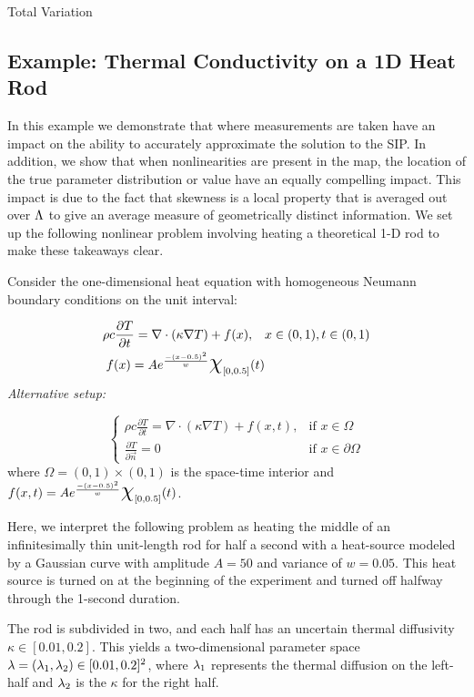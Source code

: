 Total Variation\subsection{Example: Thermal Conductivity on a 1D Heat Rod}\label{ex:heat-set-sample-accuracy}
In this example we demonstrate that where measurements are taken have an impact on the ability to accurately approximate the solution to the SIP.
In addition, we show that when nonlinearities are present in the map, the location of the true parameter distribution or value have an equally compelling impact.
This impact is due to the fact that skewness is a local property that is averaged out over ${\Lambda}$ to give an average measure of geometrically distinct information.
We set up the following nonlinear problem involving heating a theoretical 1-D rod to make these takeaways clear.

Consider the one-dimensional heat equation with homogeneous Neumann boundary conditions on the unit interval:

\begin{equation}
\begin{split}
\rho c \frac{\partial T}{\partial t} = \nabla \cdot ( \kappa \nabla T) + f(x), \quad & x\in (0,1), t\in (0,1) \\
f(x) = A e^\frac{- (x-0.5)^2}{w} \Chi_{[0,0.5]}(t)
\end{split}
\end{equation}
\emph{Alternative setup: }

\begin{equation}
\begin{cases}
\rho c \frac{\partial T}{\partial t} = \nabla \cdot ( \kappa \nabla T) + f(x,t), & \text{if } x\in \Omega \\
\frac{\partial T}{\partial \vec{n}} = 0 & \text{if } x\in \partial \Omega
\end{cases}
\end{equation}
where $\Omega = (0,1)\times (0,1)$ is the space-time interior and $f(x,t) = A e^\frac{- (x-0.5)^2}{w} \Chi_{[0,0.5]}(t)$.

Here, we interpret the following problem as heating the middle of an infinitesimally thin unit-length rod for half a second with a heat-source modeled by a Gaussian curve with amplitude $A=50$ and variance of $w=0.05$.
This heat source is turned on at the beginning of the experiment and turned off halfway through the 1-second duration.

The rod is subdivided in two, and each half has an uncertain thermal diffusivity $\kappa \in [0.01, 0.2]$.
This yields a two-dimensional parameter space $\lambda = (\lambda_1, \lambda_2) \in [0.01, 0.2]^2$, where $\lambda_1$ represents the thermal diffusion on the left-half and $\lambda_2$ is the $\kappa$ for the right half.

